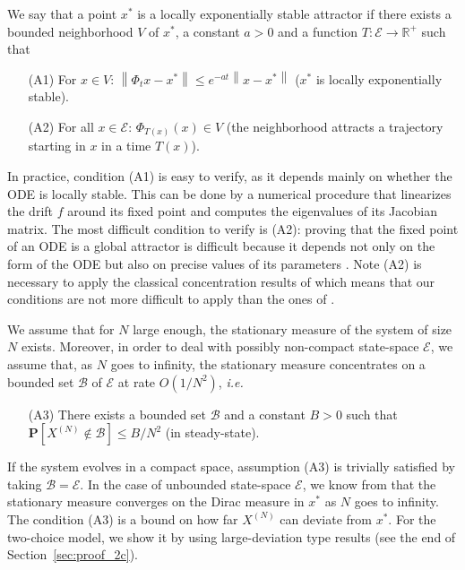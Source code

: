 \documentclass[sigconf]{acmart}
\newcommand\XN{X^{(N)}}
\newcommand\E{\mathcal{E}}
\newcommand\R{\mathbb{R}}
\newcommand\calB{\mathcal{B}}
\newcommand\sProba[1]{\mathbf{P}[#1]}
\newcommand\norm[1]{\left\|#1\right\|}
\begin{document}
We say that a point $x^*$ is a locally exponentially stable attractor
if there exists a bounded neighborhood $V$ of $x^*$, a constant $a>0$
and a function $T:\E\to\R^+$ such that
\begin{itemize}
\item[(A1)] For $x\in V$:
  $\norm{\Phi_tx-x^*}\le e^{-at}\norm{x-x^*}$ ($x^*$ is locally
  exponentially stable).
\item[(A2)] For all $x\in\E$: $\Phi_{T(x)}(x)\in V$ (the neighborhood
  attracts a trajectory starting in $x$ in a time $T(x)$).
\end{itemize}
In practice, condition (A1) is easy to verify, as it depends mainly on
whether the ODE is locally stable. This can be done by a numerical
procedure that linearizes the drift $f$ around its fixed point and
computes the eigenvalues of its Jacobian matrix. The most difficult
condition to verify is (A2): proving that the fixed point of an ODE is
a global attractor is difficult because it depends not only on the
form of the ODE but also on precise values of its parameters
\cite{benaim2008class,cho2010validity}.  Note (A2) is necessary to
apply the classical concentration results of \cite{benaim2008class}
which means that our conditions are not more difficult to apply than
the ones of \cite{benaim2008class}.

We assume that for $N$ large enough, the stationary measure of the
system of size $N$ exists. Moreover, in order to deal with possibly
non-compact state-space $\E$, we assume that, as $N$ goes to infinity,
the stationary measure concentrates on a bounded set $\calB$ of $\E$
at rate $O(1/N^2)$, \emph{i.e.}
\begin{itemize}
\item[(A3)] There exists a bounded set $\calB$ and a constant $B>0$
  such that $\sProba{\XN\not\in\calB}\le B/N^2$ (in steady-state). 
\end{itemize}
If the system evolves in a compact space, assumption (A3) is trivially
satisfied by taking $\calB=\E$. In the case of unbounded state-space
$\E$, we know from \cite{benaim2008class} that the stationary measure
converges on the Dirac measure in $x^*$ as $N$ goes to infinity. The condition
(A3) is a bound on how far $\XN$ can deviate from $x^*$.  For the
two-choice model, we show it by using large-deviation type results
(see the end of Section~\ref{sec:proof_2c}).
\end{document}
